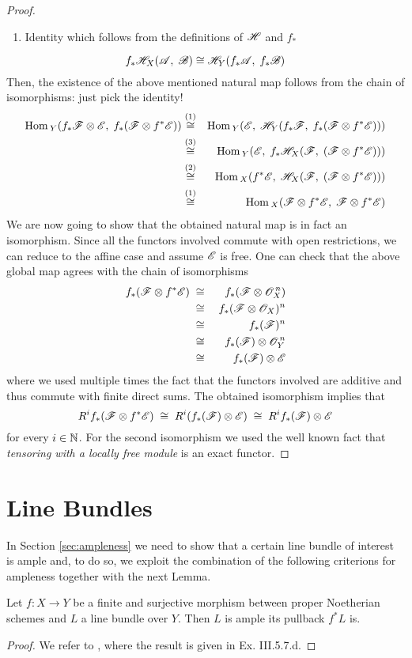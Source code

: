 \begin{proof}
\begin{enumerate}[(1)]
			\item Identity which follows from the definitions of $\mathscr{H}$ and $f_*$
		\end{enumerate}
		$$f_* \mathscr{H}_X(\mathscr{A},\;\mathscr{B}) \cong \mathscr{H}_Y(f_* \mathscr{A},\; f_* \mathscr{B})$$
		Then, the existence of the above mentioned natural map follows from the chain of isomorphisms: just pick the identity!
		\begin{eqnarray*}
			\operatorname{Hom}{}_Y(f_*\mathscr{F}\otimes \mathscr{E},\; f_*(\mathscr{F}\otimes f^* \mathscr{E})) &\overset{(1)}\cong& 
			\operatorname{Hom}{}_Y(\mathscr{E},\; \mathscr{H}_Y(f_*\mathscr{F},\;f_*(\mathscr{F}\otimes f^* \mathscr{E}))) \\
			&\overset{(3)}\cong&
			\operatorname{Hom}{}_Y(\mathscr{E},\; f_*\mathscr{H}_X(\mathscr{F},\;(\mathscr{F}\otimes f^* \mathscr{E}))) \\
			&\overset{(2)}\cong&
			\operatorname{Hom}{}_X(f^*\mathscr{E},\; \mathscr{H}_X(\mathscr{F},\;(\mathscr{F}\otimes f^* \mathscr{E}))) \\
			&\overset{(1)}\cong&
			\operatorname{Hom}{}_X(\mathscr{F} \otimes f^*\mathscr{E},\; \mathscr{F}\otimes f^* \mathscr{E})
		\end{eqnarray*}
		We are now going to show that the obtained natural map is in fact an isomorphism. Since all the functors involved commute with open restrictions, we can reduce to the affine case and assume $\mathscr{E}$ is free. One can check that the above global map agrees with the chain of isomorphisms
		\begin{eqnarray*}
			f_*(\mathscr{F}\otimes f^*\mathscr{E}) 
			&\;\cong\;& f_*(\mathscr{F}\otimes \mathscr{O}_X^{\,n}) \\
			&\;\cong\;& f_*(\mathscr{F}\otimes \mathscr{O}_X)^{n} \\ 
			&\;\cong\;& f_*(\mathscr{F})^{n} \\
			&\;\cong\;& f_*(\mathscr{F})\otimes \mathscr{O}_Y^{\,n} \\
			&\;\cong\;& f_*(\mathscr{F})\otimes \mathscr{E}
		\end{eqnarray*}
		where we used multiple times the fact that the functors involved are additive and thus commute with finite direct sums. The obtained isomorphism implies that
			$$ R^i f_*(\mathscr{F}\otimes f^*\mathscr{E}) \;\cong\; R^i (f_*(\mathscr{F})\otimes \mathscr{E}) \;\cong\; R^i f_* (\mathscr{F}) \otimes \mathscr{E} $$
			 for every $i\in \mathbb{N}$. For the second isomorphism we used the well known fact that \emph{tensoring with a locally free module} is an exact functor.
	\end{proof}

\section{Line Bundles}
	In Section \ref{sec:ampleness} we need to show that a certain line bundle of interest is ample and, to do so, we exploit the combination of the following criterions for ampleness together with the next Lemma.
	\begin{prop}\label{prop:Nakai}
		Let $f:X\to Y$ be a finite and surjective morphism between proper Noetherian schemes and $L$ a line bundle over $Y$. Then $L$ is ample \ABiff its pullback $f^*L$ is.
	\end{prop}
	\begin{proof}
		We refer to \cite{HAG}, where the result is given in Ex. III.5.7.d.
	\end{proof}

